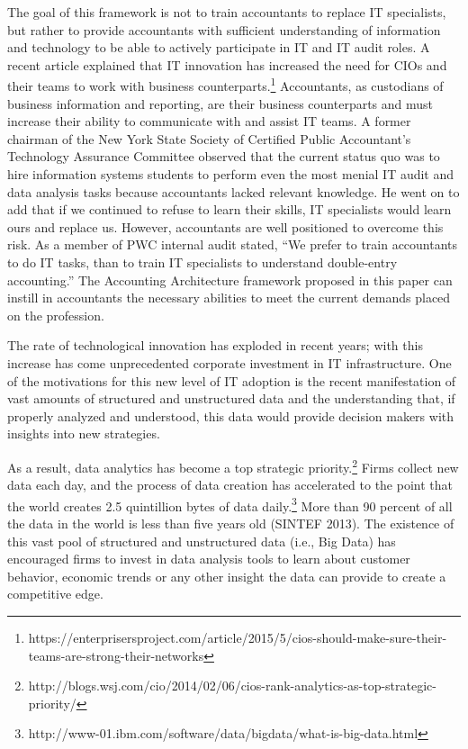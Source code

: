 \documentclass[12pt]{article}
\begin{document}
The goal of this framework is not to train accountants to replace IT specialists, but rather to provide accountants with sufficient understanding of information and technology to be able to actively participate in IT and IT audit roles. A recent article explained that IT innovation has increased the need for CIOs and their teams to work with business counterparts.\footnote{https://enterprisersproject.com/article/2015/5/cios-should-make-sure-their-teams-are-strong-their-networks} Accountants, as custodians of business information and reporting, are their business counterparts and must increase their ability to communicate with and assist IT teams. A former chairman of the New York State Society of Certified Public Accountant's Technology Assurance Committee observed that the current status quo was to hire information systems students to perform even the most menial IT audit and data analysis tasks because accountants lacked relevant knowledge. He went on to add that if we continued to refuse to learn their skills, IT specialists would learn ours and replace us. However, accountants are well positioned to overcome this risk. As a member of PWC internal audit stated, ``We prefer to train accountants to do IT tasks, than to train IT specialists to understand double-entry accounting.'' The Accounting Architecture framework proposed in this paper can instill in accountants the necessary abilities to meet the current demands placed on the profession.

The rate of technological innovation has exploded in recent years; with this increase has come unprecedented corporate investment in IT infrastructure. One of the motivations for this new level of IT adoption is the recent manifestation of vast amounts of structured and unstructured data and the understanding that, if properly analyzed and understood, this data would provide decision makers with insights into new strategies.

As a result, data analytics has become a top strategic priority.\footnote{http://blogs.wsj.com/cio/2014/02/06/cios-rank-analytics-as-top-strategic-priority/} Firms collect new data each day, and the process of data creation has accelerated to the point that the world creates 2.5 quintillion bytes of data daily.\footnote{http://www-01.ibm.com/software/data/bigdata/what-is-big-data.html} More than 90 percent of all the data in the world is less than five years old (SINTEF 2013). The existence of this vast pool of structured and unstructured data (i.e., Big Data) has encouraged firms to invest in data analysis tools to learn about customer behavior, economic trends or any other insight the data can provide to create a competitive edge.
\end{document}
